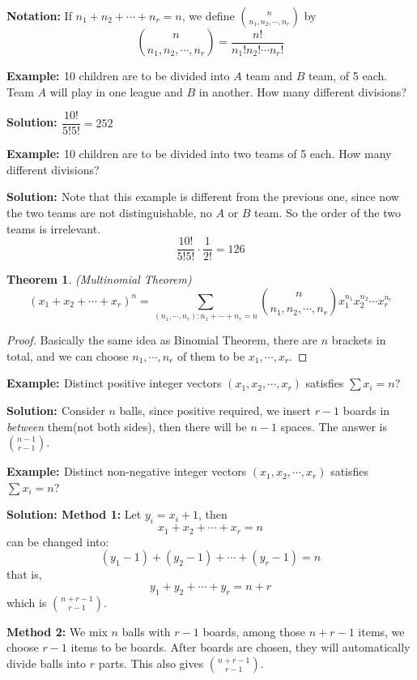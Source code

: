 \documentclass[11pt, a4paper]{MATH2421}
\newtheorem*{theorem}{Theorem}
\newcommand{\eg}{{\bf {Example: }}}
\newcommand{\sol}{{\bf {Solution: }}}
\begin{document}
\begin{spacing}{1.3}
    {\bf Notation:} If $n_1+n_2+\cdots+n_r=n$, we define 
    ${n \choose n_1,n_2,\cdots,n_r}$ by
    $${n\choose n_1,n_2,\cdots,n_r}=\frac{n!}{n_1!n_2!\cdots n_r!}$$

    \eg 10 children are to be divided into $A$ team and $B$ team,
    of 5 each. Team $A$ will play in one league and $B$ in another.
    How many different divisions?

    \sol $\dfrac{10!}{5!5!}=252$

    \eg 10 children are to be divided into two teams of 5 each.
    How many different divisions?

    \sol Note that this example is different from the previous one,
    since now the two teams are not distinguishable, no 
    $A$ or $B$ team. So the order of the two teams is irrelevant.
    $$\frac{10!}{5!5!}\cdot \frac{1}{2!}=126$$

    \begin{theorem}
        (Multinomial Theorem) 
        $$(x_1+x_2+\cdots +x_r)^n=
        \sum_{(n_1,\cdots,n_r):n_1+\cdots+n_r=n}
        {n\choose n_1,n_2,\cdots,n_r}x_1^{n_1}x_2^{n_2}
        \cdots x_r^{n_r}$$
    \end{theorem}

    \begin{proof}
        Basically the same idea as Binomial Theorem, 
        there are $n$ brackets in total, and we can choose 
        $n_1,\cdots,n_r$ of them to be $x_1,\cdots, x_r$.
    \end{proof}

    \eg Distinct positive integer vectors $(x_1,x_2,\cdots,x_r)$
    satisfies $\sum x_i=n$?

    \sol Consider $n$ balls, since positive required, 
    we insert $r-1$ boards in {\it between} them(not both sides),
    then there will be $n-1$ spaces. 
    The answer is ${n-1\choose r-1}$.

    \eg Distinct non-negative integer vectors $(x_1,x_2,\cdots,x_r)$
    satisfies $\sum x_i=n$?

    \sol {\bf Method 1: } Let $y_i=x_i+1$, then
    $$x_1+x_2+\cdots+x_r=n$$
    can be changed into:
    $$(y_1-1)+(y_2-1)+\cdots+(y_r-1)=n$$
    that is,
    $$y_1+y_2+\cdots+y_r=n+r$$
    which is ${n+r-1\choose r-1}$.

    {\bf Method 2:} We mix $n$ balls with $r-1$ boards,
    among those $n+r-1$ items, we choose $r-1$ items 
    to be boards. After boards are chosen, they will 
    automatically divide balls into $r$ parts.
    This also gives $n+r-1\choose r-1$.


\end{spacing}
\end{document}
